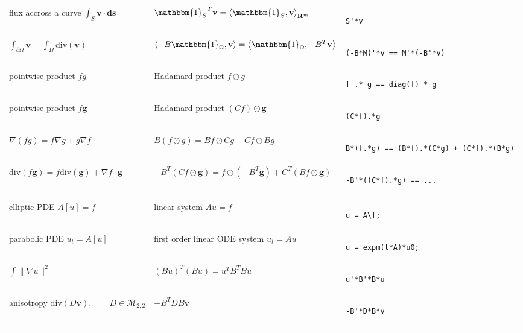 \documentclass{article}
\def\R{\mathbf{R}}
\begin{document}
\begin{tabular}{l|l|b{}}
flux accross a curve $\int_{S}\mathbf{v}\cdot\mathbf{ds}$ &
${\mathbbm{1}_S}^T\mathbf{v} = \left\langle\mathbbm{1}_S,\mathbf{v}\right\rangle_{\R^m}$ &
\begin{verbatim}
S'*v
\end{verbatim}
\\
$\int_{\partial\Omega}\mathbf{v}=\int_\Omega\mathrm{div}(\mathbf{v})$ &
$\left\langle -B\mathbbm{1}_{\Omega},\mathbf{v}\right\rangle=\left\langle\mathbbm{1}_\Omega,-B^T\mathbf{v}\right\rangle$ &
\begin{verbatim}
(-B*M)'*v == M'*(-B'*v)
\end{verbatim}
\\
pointwise product $fg$ & Hadamard product $f\odot g$ &
\begin{verbatim}
f .* g == diag(f) * g
\end{verbatim}
\\
pointwise product $f\mathbf{g}$ & Hadamard product $(Cf)\odot\mathbf{g}$ &
\begin{verbatim}
(C*f).*g
\end{verbatim}
\\
$\nabla(fg)=f\nabla g+g\nabla f$ &
$B(f\odot g)= Bf\odot Cg+Cf\odot Bg$ &
\begin{verbatim}
B*(f.*g) == (B*f).*(C*g) + (C*f).*(B*g)
\end{verbatim}
\\
$\mathrm{div}(f\mathbf{g})=f\mathrm{div}(\mathbf{g})+\nabla f\cdot\mathbf{g}$ &
$-B^T(Cf\odot\mathbf{g})= f\odot (-B^T\mathbf{g})+C^T\left(Bf\odot\mathbf{g}\right)$ &
\begin{verbatim}
-B'*((C*f).*g) == ...
\end{verbatim}
\\
&&\\
elliptic PDE $A[u]=f$ &
linear system $Au=f$ &
\begin{verbatim}
u = A\f;
\end{verbatim}
\\
parabolic PDE $u_t=A[u]$ &
first order linear ODE system $u_t=Au$ &
\begin{verbatim}
u = expm(t*A)*u0;
\end{verbatim}
\\
$\int\|\nabla u\|^2$ &
$(Bu)^T(Bu)=u^TB^TBu$ &
\begin{verbatim}
u'*B'*B*u
\end{verbatim}
\\
anisotropy $\mathrm{div}(D\mathbf{v}),\qquad D\in\mathcal{M}_{2,2}$ &
$-B^TDB\mathbf{v}$ &
\begin{verbatim}
-B'*D*B*v
\end{verbatim}
\\
\end{tabular}
\end{document}
